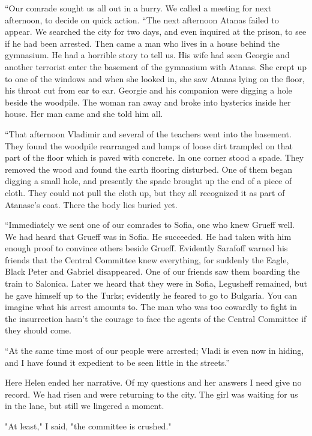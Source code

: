 \documentclass[a5paper,12pt]{book}
\begin{document}
“Our comrade sought us all out in a hurry. We called a meeting for next afternoon, to decide on quick action. “The next afternoon Atanas failed to appear. We searched the city for two days, and even inquired at the prison, to see if he had been arrested. Then came a man who lives in a house behind the gymnasium. He had a horrible story to tell us. His wife had seen Georgie and another terrorist enter the basement of the gymnasium with Atanas. She crept up to one of the windows and when she looked in, she saw Atanas lying on the floor, his throat cut from ear to ear. Georgie and his companion were digging a hole beside the woodpile. The woman ran away and broke into hysterics inside her house. Her man came and she told him all.

“That afternoon Vladimir and several of the teachers went into the basement. They found the woodpile rearranged and lumps of loose dirt trampled on that part of the floor which is paved with concrete. In one corner stood a spade. They removed the wood and found the earth flooring disturbed. One of them began digging a small hole, and presently the spade brought up the end of a piece of cloth. They could not pull the cloth up, but they all recognized it as part of Atanase’s coat. There the body lies buried yet.

“Immediately we sent one of our comrades to Sofia, one who knew Grueff well. We had heard that Grueff was in Sofia. He succeeded. He had taken with him enough proof to convince others beside Grueff. Evidently Sarafoff warned his friends that the Central Committee knew everything, for suddenly the Eagle, Black Peter and Gabriel disappeared. One of our friends saw them boarding the train to Salonica. Later we heard that they were in Sofia, Legusheff remained, but he gave himself up to the Turks; evidently he feared to go to Bulgaria. You can imagine what his arrest amounts to. The man who was too cowardly to fight in the insurrection hasn’t the courage to face the agents of the Central Committee if they should come.

“At the same time most of our people were arrested; Vladi is even now in hiding, and I have found it expedient to be seen little in the streets.”

Here Helen ended her narrative. Of my questions and her answers I need give no record. We had risen and were returning to the city. The girl was waiting for us in the lane, but still we lingered a moment.

"At least," I said, "the committee is crushed."
\end{document}
